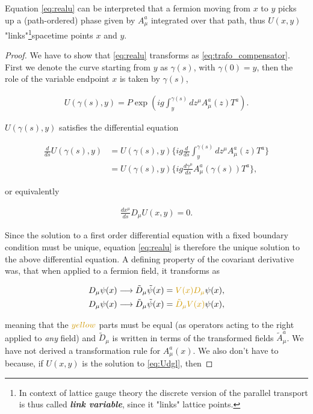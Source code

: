 \documentclass{article}
\theoremstyle{plain} %
\theoremstyle{convention} %
\theoremstyle{remark} %
\def\df#1{\textbf{\textit{#1}}}
\numberwithin{equation}{section}
\begin{document}
Equation \eqref{eq:realu} can be interpreted that a fermion moving from $x$ to $y$ picks up a (path-ordered) phase given by $A_{\mu}^a$ integrated over that path, thus $U(x,y)$ "links"\footnote{In context of lattice gauge theory the discrete version of the parallel transport is thus called \df{link variable}, since it "links" lattice points.}spacetime points $x$ and $y$.

\begin{proof}

We have to show that \eqref{eq:realu} transforms as \eqref{eq:trafo_compensator}. First we denote the curve starting from $y$ as $\gamma(s)$, with $\gamma(0)=y$, then the role of the variable endpoint $x$ is taken by $\gamma(s)$,

\begin{align*}
    U(\gamma(s) ,y) = P \exp( ig \int_{y}^{\gamma(s)} d z^{\mu} A_{\mu}^a(z) T^a ).
\end{align*}

$U(\gamma(s) ,y)$ satisfies the differential equation

\begin{align*}
    \frac{d}{ds} U(\gamma(s) ,y) &= U(\gamma(s) ,y) \bigg\{ ig \frac{d}{ds} \int_{y}^{\gamma(s)} d z^{\mu} A_{\mu}^a(z) T^a \bigg\} \\
    &= U(\gamma(s) ,y) \bigg\{ ig \frac{d \gamma^{\mu}}{ds} A_{\mu}^a(\gamma(s)) T^a \bigg\},
\end{align*}

or equivalently

\begin{align}
    \frac{dx^{\mu}}{ds} D_{\mu} U(x,y) = 0. \label{eq:Udgl}
\end{align}

Since the solution to a first order differential equation with a fixed boundary condition must be unique, equation \eqref{eq:realu} is therefore the unique solution to the above differential equation. A defining property of the covariant derivative was, that when applied to a fermion field, it transforms as

\begin{align*}
    D_{\mu} \psi(x) &\longrightarrow \tilde{D}_{\mu} \tilde{\psi}(x) = \textcolor{cyellow}{V(x) D_{\mu}} \psi(x), \\
    D_{\mu} \psi(x) &\longrightarrow \tilde{D}_{\mu} \tilde{\psi}(x) = \textcolor{cyellow}{\tilde{D}_{\mu} V(x)} \psi(x),
\end{align*}

meaning that the $\textcolor{cyellow}{yellow}$ parts must be equal (as operators acting to the right applied to \textit{any} field) and $\tilde{D}_{\mu}$ is written in terms of the transformed fields $\tilde{A}_{\mu}^a$. We have not derived a transformation rule for $A_{\mu}^a(x)$. We also don't have to because, if $U(x,y)$ is the solution to \eqref{eq:Udgl}, then


\end{proof}
\end{document}
